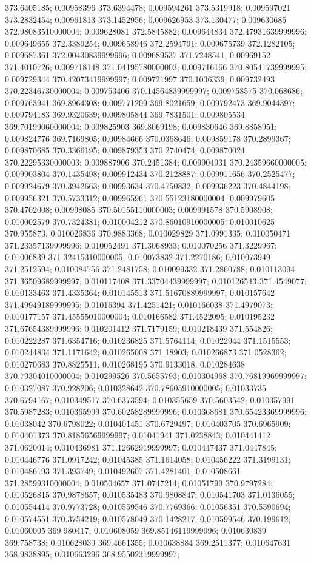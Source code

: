373.6405185; 0.00958396 373.6394478; 0.009594261 373.5319918; 0.009597021 373.2832454; 0.00961813 373.1452956; 0.009626953 373.130477; 0.009630685 372.98083510000004; 0.009628081 372.5845882; 0.009644834 372.47931639999996; 0.009649655 372.3389254; 0.009658946 372.2594791; 0.009675739 372.1282105; 0.009687361 372.00430839999996; 0.009689537 371.7248541; 0.00969152 371.4010726; 0.009718148 371.04195780000003; 0.009716166 370.80541739999995; 0.009729344 370.42073419999997; 0.009721997 370.1036339; 0.009732493 370.22346730000004; 0.009753406 370.14564839999997; 0.009758575 370.068686; 0.009763941 369.8964308; 0.009771209 369.8021659; 0.009792473 369.9044397; 0.009794183 369.9320639; 0.009805844 369.7831501; 0.009805534 369.70199060000004; 0.009825903 369.8069198; 0.009830646 369.8858951; 0.009824776 369.7169805; 0.00984666 370.0368646; 0.009859178 370.2899367; 0.009870685 370.3366195; 0.009879353 370.2740474; 0.009870024 370.22295330000003; 0.009887906 370.2451384; 0.009904931 370.24359660000005; 0.009903804 370.1435498; 0.009912434 370.2128887; 0.009911656 370.2525477; 0.009924679 370.3942663; 0.00993634 370.4750832; 0.009936223 370.4844198; 0.009956321 370.5733312; 0.009965961 370.55123180000004; 0.009979605 370.4702008; 0.00998085 370.50155110000003; 0.009991578 370.5908908; 0.010002579 370.7324381; 0.010004212 370.86010910000005; 0.010010625 370.955873; 0.010026836 370.9883368; 0.010029829 371.0991335; 0.010050471 371.23357139999996; 0.010052491 371.3068933; 0.010070256 371.3229967; 0.01006839 371.32415310000005; 0.010073832 371.2270186; 0.010073949 371.2512594; 0.010084756 371.2481758; 0.010099332 371.2860788; 0.010113094 371.36509689999997; 0.010117408 371.33704439999997; 0.010126543 371.4549077; 0.010133463 371.4335364; 0.010145513 371.51670889999997; 0.010157642 371.49949189999995; 0.01016394 371.4251421; 0.010166038 371.4979073; 0.010177157 371.45555010000004; 0.010166582 371.4522095; 0.010195232 371.67654389999996; 0.010201412 371.7179159; 0.010218439 371.554826; 0.010222287 371.6354716; 0.010236825 371.5764114; 0.01022944 371.1515553; 0.010244834 371.1171642; 0.010265008 371.18903; 0.010266873 371.0528362; 0.010270683 370.8825511; 0.010268195 370.9133018; 0.010284638 370.79304010000004; 0.010299526 370.5655793; 0.010304968 370.76819969999997; 0.010327087 370.928206; 0.010328642 370.78605910000005; 0.01033735 370.6794167; 0.010349517 370.6373594; 0.010355659 370.5603542; 0.010357991 370.5987283; 0.010365999 370.60258289999996; 0.010368681 370.65423369999996; 0.01038042 370.6798022; 0.010401451 370.6729497; 0.010403705 370.6965909; 0.010401373 370.81856569999997; 0.01041941 371.0238843; 0.010441412 371.0620014; 0.010436981 371.12662919999997; 0.010447437 371.0447845; 0.010446776 371.0917242; 0.01045385 371.1614058; 0.010456222 371.3199131; 0.010486193 371.393749; 0.010492607 371.4281401; 0.010508661 371.28599310000004; 0.010504657 371.0747214; 0.01051799 370.9797284; 0.010526815 370.9878657; 0.010535483 370.9808847; 0.010541703 371.0136055; 0.010554414 370.9773728; 0.010559546 370.7769366; 0.01056351 370.5590694; 0.010574551 370.3754219; 0.010578049 370.1428217; 0.010599546 370.199612; 0.01060005 369.980417; 0.010608059 369.85146119999996; 0.010630839 369.758738; 0.010628039 369.4661355; 0.010638884 369.2511377; 0.010647631 368.9838895; 0.010663296 368.95502319999997; 